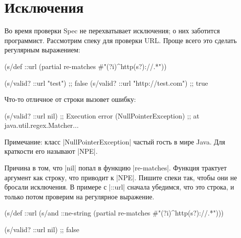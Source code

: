 \section{Исключения}


Во время проверки Spec не перехватывает исключения; о них заботится
программист. Рассмотрим спеку для проверки URL. Проще всего это сделать
регулярным выражением:


\begin{english}
  \begin{clojure}
(s/def ::url
  (partial re-matches #"(?i)^http(s?)://.*"))

(s/valid? ::url "test")            ;; false
(s/valid? ::url "http://test.com") ;; true
  \end{clojure}
\end{english}

\noindent
Что-то отличное от строки вызовет ошибку:


\begin{english}
  \begin{clojure}
(s/valid? ::url nil)
;; Execution error (NullPointerException)
;; at java.util.regex.Matcher...
  \end{clojure}
\end{english}


Примечание: класс \spverb|NullPointerException| частый гость в мире Java. Для
краткости его называют \spverb|NPE|.

Причина в том, что \spverb|nil| попал в функцию \spverb|re-matches|. Функция
трактует аргумент как строку, что приводит к \spverb|NPE|. Пишите спеки так,
чтобы они не бросали исключения. В примере с \spverb|::url| сначала убедимся,
что это строка, и только потом проверим на регулярное выражение.

\begin{english}
  \begin{clojure}
(s/def ::url
  (s/and ::ne-string
         (partial re-matches #"(?i)^http(s?)://.*")))

(s/valid? ::url nil) ;; false
  \end{clojure}
\end{english}


